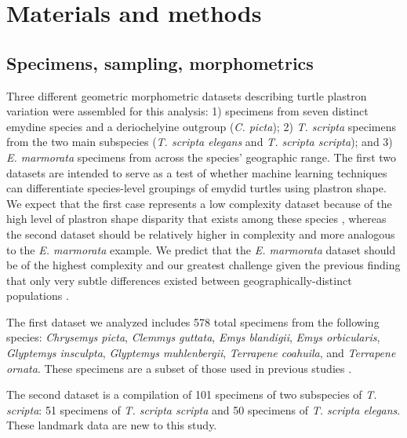 \documentclass[10pt,letterpaper]{article}
\begin{document}
\section*{Materials and methods}
\subsection*{Specimens, sampling, morphometrics}


Three different geometric morphometric datasets describing turtle plastron variation were assembled for this analysis: 1) specimens from seven distinct emydine species and a deriochelyine outgroup (\textit{C. picta}); 2) \textit{T. scripta} specimens from the two main subspecies (\textit{T. scripta elegans} and \textit{T. scripta scripta}); and 3) \textit{E. marmorata} specimens from across the species' geographic range. The first two datasets are intended to serve as a test of whether machine learning techniques can differentiate species-level groupings of emydid turtles using plastron shape. We expect that the first case represents a low complexity dataset because of the high level of plastron shape disparity that exists among these species \cite{Claude2003a,Claude2006,Angielczyk2011}, whereas the second dataset should be relatively higher in complexity and more analogous to the \textit{E. marmorata} example. We predict that the \textit{E. marmorata} dataset should be of the highest complexity and our greatest challenge given the previous finding that only very subtle differences existed between geographically-distinct populations \cite{Holland1992}.

The first dataset we analyzed includes 578 total specimens from the following species: \textit{Chrysemys picta}, \textit{Clemmys guttata}, \textit{Emys blandigii}, \textit{Emys orbicularis}, \textit{Glyptemys insculpta}, \textit{Glyptemys muhlenbergii}, \textit{Terrapene coahuila}, and \textit{Terrapene ornata}. These specimens are a subset of those used in previous studies \cite{Angielczyk2011,Angielczyk2013a}.

The second dataset is a compilation of 101 specimens of two subspecies of \textit{T. scripta}: 51 specimens of \textit{T. scripta scripta} and 50 specimens of \textit{T. scripta elegans}. These landmark data are new to this study. 
\end{document}
